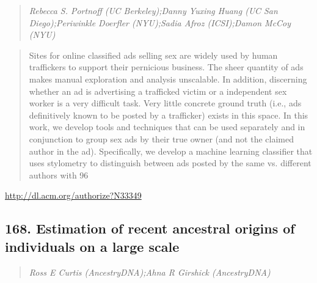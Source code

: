 \documentclass{article}
\begin{document}
\begin{quote}
\footnotesize{\textit{Rebecca S. Portnoff (UC Berkeley);Danny Yuxing Huang (UC San Diego);Periwinkle Doerfler (NYU);Sadia Afroz (ICSI);Damon McCoy (NYU)}}

\end{quote}

\begin{quote}
Sites for online classified ads selling sex are widely used by human traffickers to support their pernicious business. The sheer quantity of ads makes manual exploration and analysis unscalable. In addition, discerning whether an ad is advertising a trafficked victim or a independent sex worker is a very difficult task. Very little concrete ground truth (i.e., ads definitively known to be posted by a trafficker) exists in this space. In this work, we develop tools and techniques that can be used separately and in conjunction to group sex ads by their true owner (and not the claimed author in the ad). Specifically, we develop a machine learning classifier that uses stylometry to distinguish between ads posted by the same vs. different authors with 96%
\end{quote}

\href{http://dl.acm.org/authorize?N33349}{http://dl.acm.org/authorize?N33349}

\subsection{168. Estimation of recent ancestral origins of individuals on a large scale}

\begin{quote}
\footnotesize{\textit{Ross E Curtis (AncestryDNA);Ahna R Girshick (AncestryDNA)}}

\end{quote}
\end{document}
